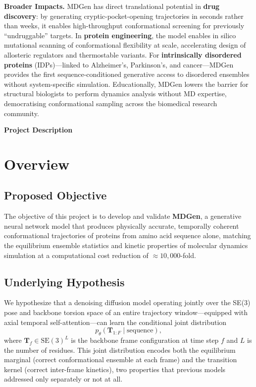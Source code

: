 \documentclass[12pt,letterpaper]{article}
\begin{document}
\vspace{6pt}
\noindent\textbf{Broader Impacts.}
MDGen has direct translational potential in \textbf{drug discovery}: by generating cryptic-pocket-opening trajectories in seconds rather than weeks, it enables high-throughput conformational screening for previously ``undruggable'' targets. In \textbf{protein engineering}, the model enables in silico mutational scanning of conformational flexibility at scale, accelerating design of allosteric regulators and thermostable variants. For \textbf{intrinsically disordered proteins} (IDPs)—linked to Alzheimer's, Parkinson's, and cancer—MDGen provides the first sequence-conditioned generative access to disordered ensembles without system-specific simulation. Educationally, MDGen lowers the barrier for structural biologists to perform dynamics analysis without MD expertise, democratising conformational sampling across the biomedical research community.

\newpage


\begin{center}
{\Large\textbf{Project Description}}
\end{center}

\section{Overview}

\subsection*{Proposed Objective}
The objective of this project is to develop and validate \textbf{MDGen}, a generative neural network model that produces physically accurate, temporally coherent conformational trajectories of proteins from amino acid sequence alone, matching the equilibrium ensemble statistics and kinetic properties of molecular dynamics simulation at a computational cost reduction of $\approx\!10{,}000$-fold.

\subsection*{Underlying Hypothesis}
We hypothesize that a denoising diffusion model operating jointly over the SE(3) pose and backbone torsion space of an entire trajectory window—equipped with axial temporal self-attention—can learn the conditional joint distribution
\begin{equation}
p_\theta(\mathbf{T}_{1:F} \mid \text{sequence}),
\end{equation}
where $\mathbf{T}_f \in \text{SE}(3)^L$ is the backbone frame configuration at time step $f$ and $L$ is the number of residues. This joint distribution encodes both the equilibrium marginal (correct conformational ensemble at each frame) and the transition kernel (correct inter-frame kinetics), two properties that previous models addressed only separately or not at all.
\end{document}
